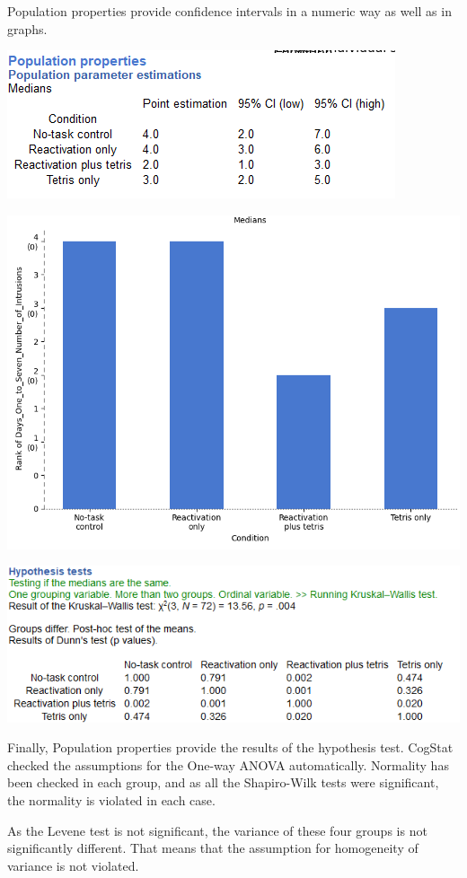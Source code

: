 \documentclass[
]{book}
\begin{document}
Population properties provide confidence intervals in a numeric way as well as in graphs.

\includegraphics{img/ch8/8.3comparegroups_popprop.png}

\includegraphics{img/ch8/8.3comparegroups_medians_histo.png}

\includegraphics{img/ch8/8.3comparegroups_hyptest.png}

Finally, Population properties provide the results of the hypothesis test. CogStat checked the assumptions for the One-way ANOVA automatically. Normality has been checked in each group, and as all the Shapiro-Wilk tests were significant, the normality is violated in each case.

As the Levene test is not significant, the variance of these four groups is not significantly different. That means that the assumption for homogeneity of variance is not violated.
\end{document}
